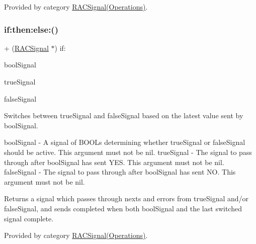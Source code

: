 Provided by category \mbox{\hyperlink{category_r_a_c_signal_07_operations_08_a67c14dfcf505999bc53632e336f6cb84}{R\+A\+C\+Signal(\+Operations)}}.

\mbox{\label{interface_r_a_c_signal_a67c14dfcf505999bc53632e336f6cb84}} 
\subsubsection{\texorpdfstring{if\+:then\+:else\+:()}{if:then:else:()}\hspace{0.1cm}{\footnotesize\ttfamily [2/3]}}
{\footnotesize\ttfamily + (\mbox{\hyperlink{interface_r_a_c_signal}{R\+A\+C\+Signal}} $\ast$) if\+: \begin{DoxyParamCaption}\item[{(\mbox{\hyperlink{interface_r_a_c_signal}{R\+A\+C\+Signal}} $\ast$)}]{bool\+Signal }\item[{then:(\mbox{\hyperlink{interface_r_a_c_signal}{R\+A\+C\+Signal}} $\ast$)}]{true\+Signal }\item[{else:(\mbox{\hyperlink{interface_r_a_c_signal}{R\+A\+C\+Signal}} $\ast$)}]{false\+Signal }\end{DoxyParamCaption}}

Switches between {\ttfamily true\+Signal} and {\ttfamily false\+Signal} based on the latest value sent by {\ttfamily bool\+Signal}.

bool\+Signal -\/ A signal of B\+O\+O\+Ls determining whether {\ttfamily true\+Signal} or {\ttfamily false\+Signal} should be active. This argument must not be nil. true\+Signal -\/ The signal to pass through after {\ttfamily bool\+Signal} has sent Y\+ES. This argument must not be nil. false\+Signal -\/ The signal to pass through after {\ttfamily bool\+Signal} has sent NO. This argument must not be nil.

Returns a signal which passes through {\ttfamily next}s and {\ttfamily error}s from {\ttfamily true\+Signal} and/or {\ttfamily false\+Signal}, and sends {\ttfamily completed} when both {\ttfamily bool\+Signal} and the last switched signal complete. 

Provided by category \mbox{\hyperlink{category_r_a_c_signal_07_operations_08_a67c14dfcf505999bc53632e336f6cb84}{R\+A\+C\+Signal(\+Operations)}}.

\mbox{\label{interface_r_a_c_signal_a67c14dfcf505999bc53632e336f6cb84}} 
